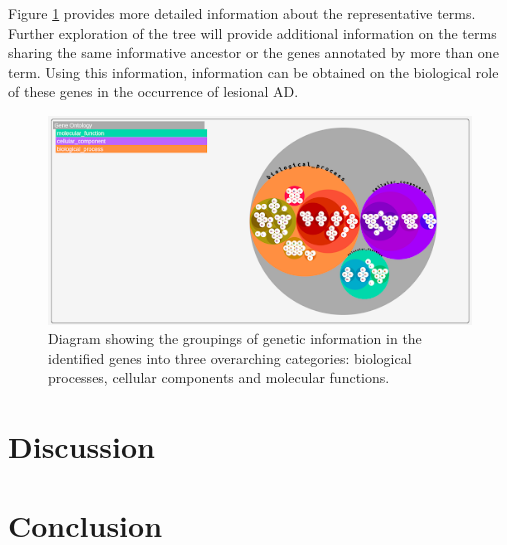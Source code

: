 \documentclass[journal, a4paper]{IEEEtran}
\begin{document}
Figure \ref{fig:gene-ontology} provides more detailed information about the representative terms. Further exploration of the tree will provide additional information on the terms sharing the same informative ancestor or the genes annotated by more than one term. Using this information, information can be obtained on the biological role of these genes in the occurrence of lesional AD.

\begin{figure}[!htp]
  \begin{center}
    \begin{minipage}{0.5 \textwidth}
      \centering
      \includegraphics[width=\textwidth]{gene-ontology.png}
      \caption{Diagram showing the groupings of genetic information in the identified genes into three overarching categories: biological processes, cellular components and molecular functions.}
      \label{fig:gene-ontology}
    \end{minipage}
  \end{center}
\end{figure}



\section{Discussion}

\section{Conclusion}




\end{document}
